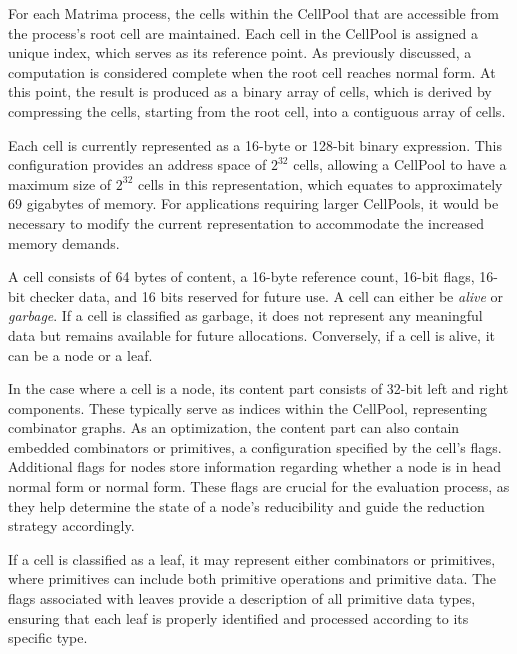 \documentclass{IEEEtran}
\begin{document}
\par For each Matrima process, the cells within the CellPool that are accessible from the process's root cell are maintained. Each cell in the CellPool is assigned a unique index, which serves as its reference point. As previously discussed, a computation is considered complete when the root cell reaches normal form. At this point, the result is produced as a binary array of cells, which is derived by compressing the cells, starting from the root cell, into a contiguous array of cells.

\par Each cell is currently represented as a 16-byte or 128-bit binary expression. This configuration provides an address space of \(2^{32}\) cells, allowing a CellPool to have a maximum size of \(2^{32}\) cells in this representation, which equates to approximately 69 gigabytes of memory. For applications requiring larger CellPools, it would be necessary to modify the current representation to accommodate the increased memory demands.

\par A cell consists of 64 bytes of content, a 16-byte reference count, 16-bit flags, 16-bit checker data, and 16 bits reserved for future use. A cell can either be \textit{alive} or \textit{garbage}. If a cell is classified as garbage, it does not represent any meaningful data but remains available for future allocations. Conversely, if a cell is alive, it can be a node or a leaf.

\par In the case where a cell is a node, its content part consists of 32-bit left and right components. These typically serve as indices within the CellPool, representing combinator graphs. As an optimization, the content part can also contain embedded combinators or primitives, a configuration specified by the cell's flags. Additional flags for nodes store information regarding whether a node is in head normal form or normal form. These flags are crucial for the evaluation process, as they help determine the state of a node's reducibility and guide the reduction strategy accordingly.

\par If a cell is classified as a leaf, it may represent either combinators or primitives, where primitives can include both primitive operations and primitive data. The flags associated with leaves provide a description of all primitive data types, ensuring that each leaf is properly identified and processed according to its specific type.
\end{document}
